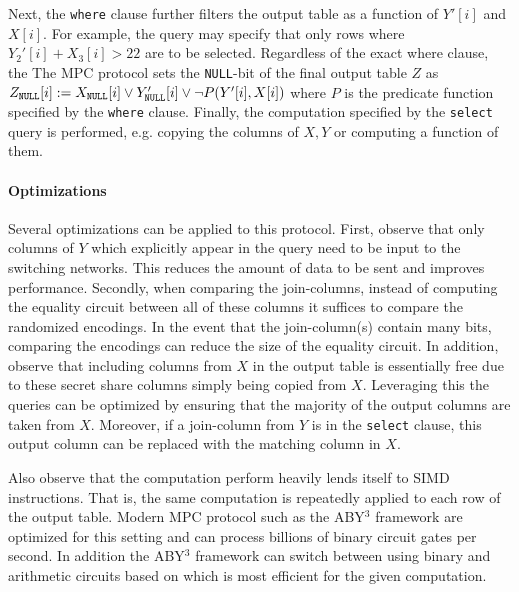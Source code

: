 Next, the \texttt{where} clause further filters the output table as a function of $Y'[i]$ and $X[i]$. 
\iffullversion
For example, the query may specify that only rows where $Y_2'[i] + X_3[i] > 22$  are to be selected. Regardless of the exact where clause, the 
\else 
The
\fi
MPC protocol sets the \texttt{NULL}-bit of the final output table $Z$ as $Z_\texttt{NULL}[i] :=X_\texttt{NULL}[i] \vee Y_\texttt{NULL}'[i] \vee \neg  P(Y'[i], X[i])$ where $P$ is the predicate function specified by the \texttt{where} clause.
Finally, the computation specified by the \texttt{select} query is performed, e.g. copying the columns of $X,Y$ or computing a function of them. 


\iffullversion
\paragraph{Optimizations}
Several optimizations can be applied to this protocol. First, observe that only columns of $Y$ which explicitly appear in the query need to be input to the switching networks. This reduces the amount of data to be sent and improves performance. Secondly, when comparing the join-columns, instead of computing the equality circuit between all of these columns it suffices to compare the randomized encodings. In the event that the join-column(s) contain many bits, comparing the encodings can reduce the size of the equality circuit. In addition, observe that including columns from $X$ in the output table is essentially free due to these secret share columns simply being copied from $X$. Leveraging this the queries can be optimized by ensuring that the majority of the output columns are taken from $X$. Moreover, if a join-column from $Y$ is in the \texttt{select} clause, this output column can be replaced with the matching column in $X$.

Also observe that the computation perform heavily lends itself to SIMD instructions. That is, the same computation is repeatedly applied to each row of the output table. Modern MPC protocol such as the ABY$^3$ framework \cite{aby3,highthroughput} are optimized for this setting and can process billions of binary circuit gates per second\cite{highthroughput}. In addition the ABY$^3$ framework can switch between using binary and arithmetic circuits based on which is most efficient for the given computation. 
\fi

